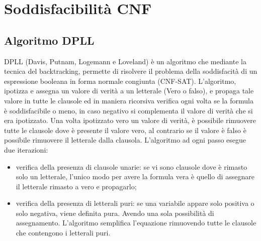\documentclass[a4paper,11pt]{article} %
\begin{document}
\pagebreak

\section{Soddisfacibilità CNF}
\subsection{Algoritmo DPLL}
DPLL (Davis, Putnam, Logemann e Loveland) è un algoritmo che mediante la tecnica del backtracking, permette di risolvere il problema della soddisfacità di un espressione booleana in forma normale congiunta (CNF-SAT). L’algoritmo, ipotizza e assegna un valore di verità a un letterale (Vero o falso), e propaga tale valore in tutte le clausole ed in maniera ricorsiva verifica ogni volta se la formula è soddisfacibile o meno, in caso negativo si complementa il valore di verità che si era ipotizzato. Una volta ipotizzato vero un valore di verità, è possibile rimuovere tutte le clausole dove è presente il valore vero,
al contrario se il valore è falso è possibile rimuovere il letterale dalla clausola.
L’algoritmo ad ogni passo esegue due iterazioni:
\begin{itemize}
	\item verifica della presenza di clausole unarie: se vi sono clausole dove è rimasto solo un letterale, l’unico modo per avere la formula vera è quello di assegnare il letterale rimasto a vero e propagarlo;
	\item verifica della presenza di letterali puri: se una variabile appare solo positiva o solo negativa, viene definita pura. Avendo una sola possibilità di assegnamento. L’algoritmo semplifica l’equazione rimuovendo tutte le clausole che contengono i letterali puri.
\end{itemize}
\end{document}
